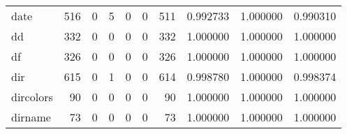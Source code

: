 \begin{tabular}{lrrrrrrrrr}
date      &                                   516 &                                                  0 &                                                  5 &                                                  0 &                                                  0 &                                                511 &                                           0.992733 &                               1.000000 &                             0.990310 \\
dd        &                                   332 &                                                  0 &                                                  0 &                                                  0 &                                                  0 &                                                332 &                                           1.000000 &                               1.000000 &                             1.000000 \\
df        &                                   326 &                                                  0 &                                                  0 &                                                  0 &                                                  0 &                                                326 &                                           1.000000 &                               1.000000 &                             1.000000 \\
dir       &                                   615 &                                                  0 &                                                  1 &                                                  0 &                                                  0 &                                                614 &                                           0.998780 &                               1.000000 &                             0.998374 \\
dircolors &                                    90 &                                                  0 &                                                  0 &                                                  0 &                                                  0 &                                                 90 &                                           1.000000 &                               1.000000 &                             1.000000 \\
dirname   &                                    73 &                                                  0 &                                                  0 &                                                  0 &                                                  0 &                                                 73 &                                           1.000000 &                               1.000000 &                             1.000000 \\

\end{tabular}
